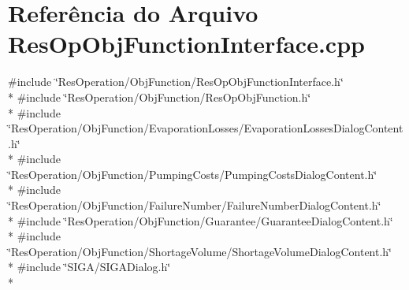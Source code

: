 \section{Referência do Arquivo Res\+Op\+Obj\+Function\+Interface.\+cpp}
\label{_obj_function_2_res_op_obj_function_interface_8cpp}
{\ttfamily \#include \char`\"{}Res\+Operation/\+Obj\+Function/\+Res\+Op\+Obj\+Function\+Interface.\+h\char`\"{}}\\*
{\ttfamily \#include \char`\"{}Res\+Operation/\+Obj\+Function/\+Res\+Op\+Obj\+Function.\+h\char`\"{}}\\*
{\ttfamily \#include \char`\"{}Res\+Operation/\+Obj\+Function/\+Evaporation\+Losses/\+Evaporation\+Losses\+Dialog\+Content.\+h\char`\"{}}\\*
{\ttfamily \#include \char`\"{}Res\+Operation/\+Obj\+Function/\+Pumping\+Costs/\+Pumping\+Costs\+Dialog\+Content.\+h\char`\"{}}\\*
{\ttfamily \#include \char`\"{}Res\+Operation/\+Obj\+Function/\+Failure\+Number/\+Failure\+Number\+Dialog\+Content.\+h\char`\"{}}\\*
{\ttfamily \#include \char`\"{}Res\+Operation/\+Obj\+Function/\+Guarantee/\+Guarantee\+Dialog\+Content.\+h\char`\"{}}\\*
{\ttfamily \#include \char`\"{}Res\+Operation/\+Obj\+Function/\+Shortage\+Volume/\+Shortage\+Volume\+Dialog\+Content.\+h\char`\"{}}\\*
{\ttfamily \#include \char`\"{}S\+I\+G\+A/\+S\+I\+G\+A\+Dialog.\+h\char`\"{}}\\*
